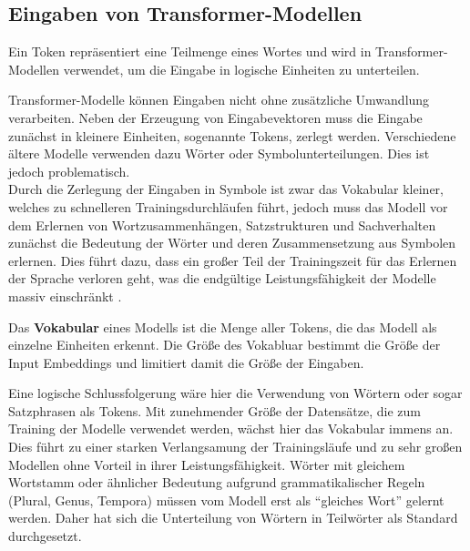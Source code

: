 
\subsection{Eingaben von Transformer-Modellen}
\begin{definition}[Token]\label{def:token}
    Ein Token repräsentiert eine Teilmenge eines Wortes und wird in Transformer-Modellen verwendet, um die Eingabe in logische Einheiten zu unterteilen.
\end{definition}
Transformer-Modelle können Eingaben nicht ohne zusätzliche Umwandlung verarbeiten.
Neben der Erzeugung von Eingabevektoren muss die Eingabe zunächst in kleinere Einheiten, sogenannte Tokens, zerlegt werden.
Verschiedene ältere Modelle verwenden dazu Wörter oder Symbolunterteilungen.
Dies ist jedoch problematisch.\\

Durch die Zerlegung der Eingaben in Symbole ist zwar das Vokabular kleiner, welches zu schnelleren Trainingsdurchläufen führt, jedoch muss das Modell vor dem Erlernen von Wortzusammenhängen, Satzstrukturen und Sachverhalten zunächst die Bedeutung der Wörter und deren Zusammensetzung aus Symbolen erlernen.
Dies führt dazu, dass ein großer Teil der Trainingszeit für das Erlernen der Sprache verloren geht, was die endgültige Leistungsfähigkeit der Modelle massiv einschränkt \citep{bpe}.\\

\begin{definition}\label{def:vokabular}
    Das \textbf{Vokabular} eines Modells ist die Menge aller Tokens, die das Modell als einzelne Einheiten erkennt. Die Größe des Vokabluar bestimmt die Größe der Input Embeddings und limitiert damit die Größe der Eingaben.
\end{definition}

Eine logische Schlussfolgerung wäre hier die Verwendung von Wörtern oder sogar Satzphrasen als Tokens.
Mit zunehmender Größe der Datensätze, die zum Training der Modelle verwendet werden, wächst hier das Vokabular immens an.
Dies führt zu einer starken Verlangsamung der Trainingsläufe und zu sehr großen Modellen ohne Vorteil in ihrer Leistungsfähigkeit.
Wörter mit gleichem Wortstamm oder ähnlicher Bedeutung aufgrund grammatikalischer Regeln (Plural, Genus, Tempora) müssen vom Modell erst als \enquote{gleiches Wort} gelernt werden.
Daher hat sich die Unterteilung von Wörtern in Teilwörter als Standard durchgesetzt.

